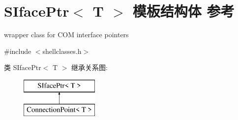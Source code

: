 \hypertarget{struct_s_iface_ptr}{}\section{S\+Iface\+Ptr$<$ T $>$ 模板结构体 参考}
\label{struct_s_iface_ptr}


wrapper class for C\+OM interface pointers  




{\ttfamily \#include $<$shellclasses.\+h$>$}

类 S\+Iface\+Ptr$<$ T $>$ 继承关系图\+:\begin{figure}[H]
\begin{center}
\leavevmode
\includegraphics[height=2.000000cm]{struct_s_iface_ptr}
\end{center}
\end{figure}
